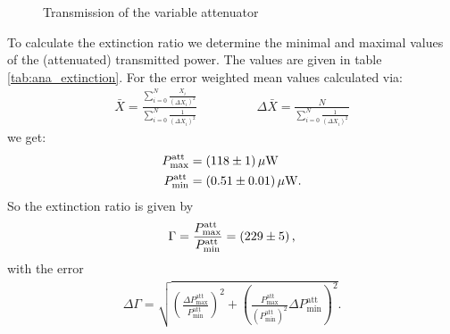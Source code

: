 \documentclass{protokoll_en}
\begin{document}
\begin{figure}[H]
  \resizebox{0.8\textwidth}{!}{
     
}
  \caption{Transmission of the variable attenuator}
  \label{fig:ana_var_att}
\end{figure}
To calculate the extinction ratio we determine the minimal and maximal values of the (attenuated) transmitted power. The values are given in table \ref{tab:ana_extinction}. For the error weighted mean values calculated via:
\begin{align*}
\bar{X} = \frac{\sum_{i=0}^N \frac{X_i}{(\Delta X_i)^2}}{\sum_{i=0}^N \frac{1}{(\Delta X_i)^2}}\hspace{2cm} \Delta \bar{X} = \frac{N}{\sum_{i=0}^N \frac{1}{(\Delta X_i)^2}}
\end{align*}
we get:
\begin{align*}
P_\textrm{max}^\textrm{att}&=\unit[(118 \pm 1)]{\mu W}\\
P_\textrm{min}^\textrm{att}&=\unit[(0.51 \pm 0.01)]{\mu W}\textrm{.}
\end{align*}
So the extinction ratio is given by
\begin{align}
\Gamma=\frac{P_\textrm{max}^\textrm{att}}{P_\textrm{min}^\textrm{att}}=\unit[(229 \pm 5)]{}\textrm{,}
\end{align}
with the error
\begin{align*}
\Delta\Gamma=\sqrt{\left(\frac{\Delta P_\textrm{max}^\textrm{att}}{P_\textrm{min}^\textrm{att}}\right)^2+\left(\frac{ P_\textrm{max}^\textrm{att}}{\left(P_\textrm{min}^\textrm{att}\right)^2}\Delta P_\textrm{min}^\textrm{att}\right)^2}\textrm{.}
\end{align*}
\begin{table}[H]
  \centering
{}
\caption{Minimal and maximal transmitted power of the $\lambda / 2$ plate (attenuated)}
  \label{tab:ana_extinction}
\end{table}
\end{document}
